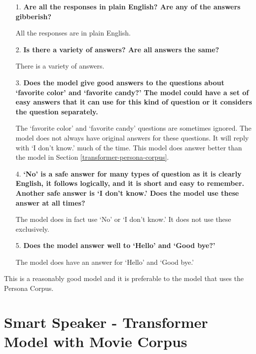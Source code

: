 \begin{itemize}
	\item [1.] \textbf{Are all the responses in plain English? Are any of the answers gibberish?}
	
	\item []All the responses are in plain English. 
	
	\item [2.] \textbf{Is there a  variety of answers? Are all answers the same?}
	
	\item []There is a variety of answers. 
	
	\item [3.] \textbf{Does the model give good answers to the questions about `favorite color' and `favorite candy?' The model could have a set of easy answers that it can use for this kind of question or it considers the question separately. }
	
	\item []The `favorite color' and `favorite candy' questions are sometimes ignored. The model does not always have original answers for these questions. It will reply with `I don't know.' much of the time. This model does answer better than the model in Section \ref{transformer-persona-corpus}.
	
	\item [4.] \textbf{`No' is a safe answer for many types of question as it is clearly English, it follows logically, and it is short and easy to remember. Another safe answer is `I don't know.' Does the model use these answer at all times?}
	
	\item []The model does in fact use `No' or `I don't know.' It does not use these exclusively.
	
	\item [5.] \textbf{Does the model answer well to `Hello' and `Good bye?'}
	
	\item []The model does have an answer for `Hello' and `Good bye.'
\end{itemize}

This is a reasonably good model and it is preferable to the model that uses the Persona Corpus.

\section{Smart Speaker - Transformer Model with Movie Corpus}

